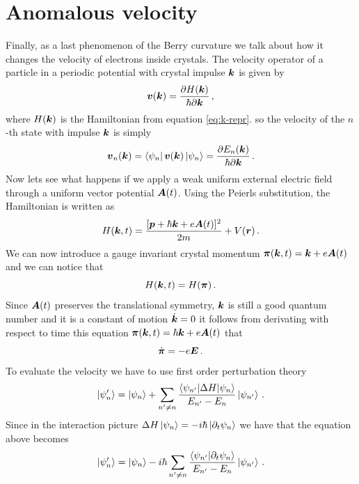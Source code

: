 \section{Anomalous velocity}
Finally, as a last phenomenon of the Berry curvature we talk about how it changes the velocity of electrons inside crystals. The velocity operator of a particle in a periodic potential with crystal impulse $\boldsymbol{k}$ is given by \cite{grosso2013solid}
\begin{equation}
    \boldsymbol{v}(\boldsymbol{k})= \frac{\partial H(\boldsymbol{k})}{\hbar \partial \boldsymbol{k}}\,,
    \label{eq:cryspeed}
\end{equation}
where $H(\boldsymbol{k})$ is the Hamiltonian from equation \ref{eq:k-repr}. so the velocity of the $n$-th state with impulse $\boldsymbol{k}$ is simply
\begin{equation}
    \boldsymbol{v}_n(\boldsymbol{k})=\bra{\psi_{n}}\boldsymbol{v}(\boldsymbol{k})\ket{\psi_{n}}=\frac{\partial E_n(\boldsymbol{k})}{\hbar \partial \boldsymbol{k}}\,.
\end{equation}
Now lets see what happens if we apply a weak uniform external electric field through a uniform vector potential $\boldsymbol{A}(t)$. Using the Peierls substitution, the Hamiltonian is written as 
\begin{equation}
    H(\boldsymbol{k},t)= \frac{[\boldsymbol{p}+\hbar\boldsymbol{k} +e\boldsymbol{A}(t)]^2}{2m}+V(\boldsymbol{r})\,.
\end{equation}
We can now introduce a gauge invariant crystal momentum $\boldsymbol{\pi}(\boldsymbol{k}, t)=\boldsymbol{k} +e\boldsymbol{A}(t)$ and we can notice that
\begin{equation}
    H(\boldsymbol{k},t)=H(\boldsymbol{\pi})\,.
\end{equation}
Since $\boldsymbol{A} (t)$ preserves the translational symmetry, $\boldsymbol{k}$ is still a good quantum number and it is a constant of motion $\dot{\boldsymbol{k}}=0$ it follows from derivating with respect to time this equation $\boldsymbol{\pi}(\boldsymbol{k}, t)=\hbar \boldsymbol{k} +e\boldsymbol{A}(t)$ that
\begin{equation}
   \dot{\boldsymbol{\pi}}=-e \boldsymbol{E}\,.
   \label{eq:pidt}
\end{equation}
To evaluate the velocity we have to use first order perturbation theory \cite{thouless1983quantization}
\begin{equation}
    \ket{\psi'_n}=\ket{\psi_n}+\sum_{n'\neq n}\frac{\braket{\psi_{n'}}{\Delta H|\psi_n}}{E_{n'}-E_n}\ket{\psi_{n'}}\,.
\end{equation}
Since in the interaction picture $\Delta H\ket{\psi_n}=-i\hbar\ket{\partial_t\psi_n}$
we have that the equation above becomes
\begin{equation}
    \ket{\psi'_n}=\ket{\psi_n}-i\hbar\sum_{n'\neq n}\frac{\braket{\psi_{n'}}{\partial_t\psi_n}}{E_{n'}-E_n}\ket{\psi_{n'}}\,.
\end{equation}
